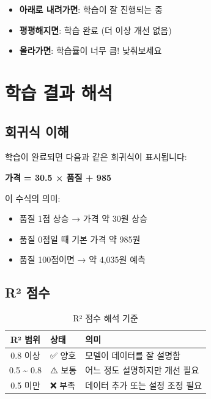\documentclass[11pt,a4paper]{article}
\begin{document}
\begin{itemize}
  \item \textbf{아래로 내려가면}: 학습이 잘 진행되는 중
  \item \textbf{평평해지면}: 학습 완료 (더 이상 개선 없음)
  \item \textbf{올라가면}: 학습률이 너무 큼! 낮춰보세요
\end{itemize}

\section{학습 결과 해석}

\subsection{회귀식 이해}

학습이 완료되면 다음과 같은 회귀식이 표시됩니다:

\begin{tcolorbox}[colback=grayBg, colframe=gray]
\centering
\textbf{가격 = 30.5 × 품질 + 985}
\end{tcolorbox}

이 수식의 의미:
\begin{itemize}
  \item 품질 1점 상승 → 가격 약 30원 상승
  \item 품질 0점일 때 기본 가격 약 985원
  \item 품질 100점이면 → 약 4,035원 예측
\end{itemize}

\subsection{R² 점수}

\begin{table}[H]
\centering
\caption{R² 점수 해석 기준}
\label{tab:r2_interpretation}
\begin{tabular}{c|l|l}
\toprule
\textbf{R² 범위} & \textbf{상태} & \textbf{의미} \\
\midrule
0.8 이상 & ✅ 양호 & 모델이 데이터를 잘 설명함 \\
0.5 \textasciitilde{} 0.8 & ⚠️ 보통 & 어느 정도 설명하지만 개선 필요 \\
0.5 미만 & ❌ 부족 & 데이터 추가 또는 설정 조정 필요 \\
\bottomrule
\end{tabular}
\end{table}
\end{document}
